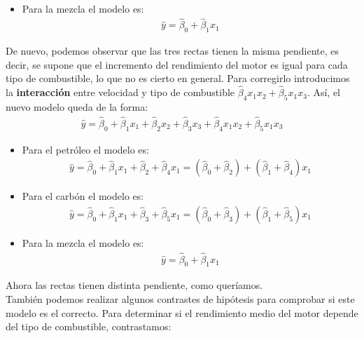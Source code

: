\begin{ejemplo}
\begin{itemize}
\begin{align*}
            \end{align*}
    \item Para la mezcla el modelo es:
            \begin{align*}
                  \widehat{y} = \widehat{\beta}_0 + \widehat{\beta}_1x_1
            \end{align*}
\end{itemize}
De nuevo, podemos observar que las tres rectas tienen la misma pendiente, es decir, se supone que el incremento del rendimiento del motor es igual para cada tipo de combustible, lo que no es cierto en general. Para corregirlo introducimos la \textbf{interacción} entre velocidad y tipo de combustible $\widehat{\beta}_4x_1x_2 + \widehat{\beta}_5x_1x_3$. Así, el nuevo modelo queda de la forma:
\begin{align*}
        \widehat{y} = \widehat{\beta}_0 + \widehat{\beta}_1x_1 + \widehat{\beta}_2x_2 + \widehat{\beta}_3x_3 + \widehat{\beta}_4x_1x_2 + \widehat{\beta}_5x_1x_3
\end{align*}
\begin{itemize}
    \item Para el petróleo el modelo es:
              \begin{align*}
                  \widehat{y} = \widehat{\beta}_0 + \widehat{\beta}_1x_1 + \widehat{\beta}_2 + \widehat{\beta}_4x_1 = (\widehat{\beta}_0 + \widehat{\beta}_2) + (\widehat{\beta}_1 + \widehat{\beta}_4)x_1
              \end{align*}
    \item Para el carbón el modelo es:
              \begin{align*}
                  \widehat{y} = \widehat{\beta}_0 + \widehat{\beta}_1x_1 + \widehat{\beta}_3 + \widehat{\beta}_5x_1 = (\widehat{\beta}_0 + \widehat{\beta}_3) + (\widehat{\beta}_1 + \widehat{\beta}_5)x_1
              \end{align*}
    \item Para la mezcla el modelo es:
              \begin{align*}
                  \widehat{y} = \widehat{\beta}_0 + \widehat{\beta}_1x_1
              \end{align*}
\end{itemize}
Ahora las rectas tienen distinta pendiente, como queríamos.
\\
\newline
También podemos realizar algunos contrastes de hipótesis para comprobar si este modelo es el correcto. Para determinar si el rendimiento medio del motor depende del tipo de combustible, contrastamos:

\end{ejemplo}
